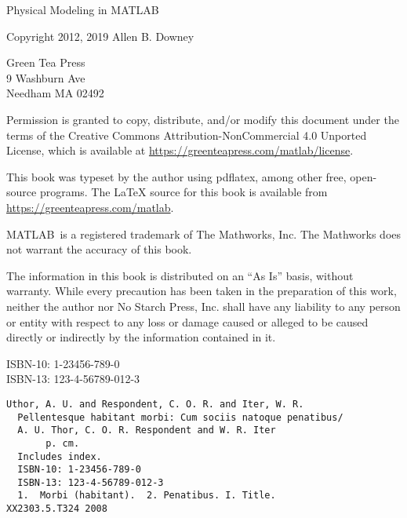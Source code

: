 \documentclass{book}
\title{\thetitle}
\author{\theauthors}
\date{Version \theversion}
\newcommand{\thetitle}{Physical Modeling in MATLAB}
\begin{document}
\sloppy

\frontmatter




\maketitle

\vspace{2in}

\begin{center}
 {\Large \thetitle}

\vspace{0.25in}

Copyright 2012, 2019 Allen B. Downey
\end{center}

\vspace{0.25in}

\begin{flushleft}
Green Tea Press       \\
9 Washburn Ave \\
Needham MA 02492
\end{flushleft}

Permission is granted to copy, distribute, and/or modify this document under the terms of the Creative Commons Attribution-NonCommercial 4.0 Unported License, which is available at \url{https://greenteapress.com/matlab/license}.

This book was typeset by the author using pdflatex, among other free, open-source programs.
 The LaTeX source for this book is available from \url{https://greenteapress.com/matlab}.

MATLAB\myreg\ is a registered trademark of The Mathworks, Inc.  The Mathworks does not warrant the accuracy  of this book.

The information in this book is distributed on an ``As Is'' basis,
without warranty. While every precaution has been taken in the
preparation of this work, neither the author nor No Starch Press, Inc.
shall have any liability to any person or entity with respect to any
loss or damage caused or alleged to be caused directly or indirectly
by the information contained in it.


ISBN-10: 1-23456-789-0\\
ISBN-13: 123-4-56789-012-3


\begin{verbatim}
Uthor, A. U. and Respondent, C. O. R. and Iter, W. R.
  Pellentesque habitant morbi: Cum sociis natoque penatibus/
  A. U. Thor, C. O. R. Respondent and W. R. Iter
       p. cm.
  Includes index.
  ISBN-10: 1-23456-789-0
  ISBN-13: 123-4-56789-012-3
  1.  Morbi (habitant).  2. Penatibus. I. Title.
XX2303.5.T324 2008
\end{verbatim}
\end{document}
